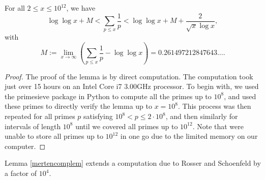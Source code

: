 \documentclass[12pt]{amsart}
\begin{document}
\begin{lemma}\label{mertencomplem}
    For all $2\le x\le 10^{12}$, we have
    \begin{equation*}
        \log\log x+M<\sum_{p\le x}\frac{1}{p}<\log\log x+M+\frac{2}{\sqrt{x}\log x},
    \end{equation*}
    with
    \begin{equation}
    \label{eq:MM}
        M:=\lim_{x \rightarrow \infty} \left(\sum_{p\le x}\frac{1}{p}-\log\log x\right)=0.26149 72128 47643\ldots.
    \end{equation}
\end{lemma}
\begin{proof}
    The proof of the lemma is by direct computation. The computation took just over 15 hours on an Intel Core i7 3.00GHz processor. To begin with, we used the primesieve package in Python to compute all the primes up to $10^8$, and used these primes to directly verify the lemma up to $x=10^8$. This process was then repeated for all primes $p$ satisfying $10^8<p\le 2\cdot 10^8$, and then similarly for intervals of length $10^8$ until we covered all primes up to $10^{12}$. Note that were unable to store all primes up to $10^{12}$ in one go due to the limited memory on our computer.
\end{proof}
\begin{remark}
    Lemma \ref{mertencomplem} extends a computation due to Rosser and Schoenfeld \cite[Theorem 20]{R-S} by a factor of $10^4$.
\end{remark}
\end{document}
